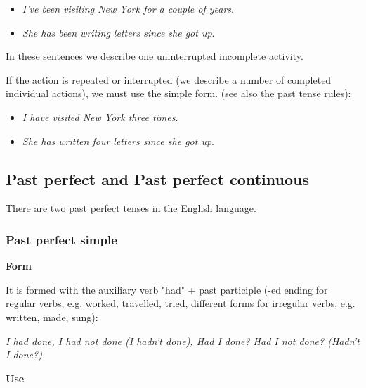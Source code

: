 \begin{itemize}
\begin{itemize}
\item \textit{I've been visiting New York for a couple of years}.
\item \textit{She has been writing letters since she got up}.
\end{itemize}

In these sentences we describe one uninterrupted incomplete activity.

If the action is repeated or interrupted (we describe a number of completed individual actions), we must use the simple form. (see also the past tense rules):

\begin{itemize}
\item \textit{I have visited New York three times}.
\item \textit{She has written four letters since she got up}.
\end{itemize}

\end{itemize}


\subsection{Past perfect and Past perfect continuous}

There are two past perfect tenses in the English language.

\subsubsection{Past perfect simple}

\textbf{Form}

It is formed with the auxiliary verb "had" + past participle (-ed ending for regular verbs, e.g. worked, travelled, tried, different forms for irregular verbs, e.g. written, made, sung):

\textit{I had done, I had not done (I hadn't done), Had I done? Had I not done? (Hadn't I done?)}

\textbf{Use}

